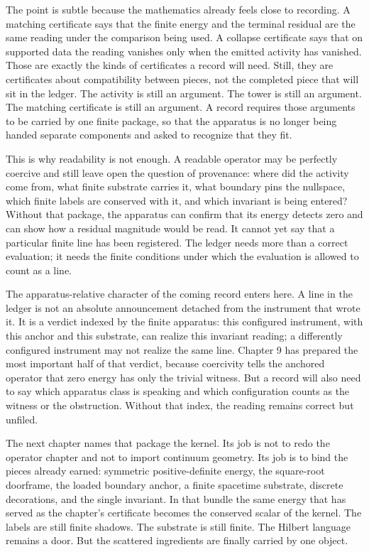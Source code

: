 The point is subtle because the mathematics already feels close to recording. A
matching certificate says that the finite energy and the terminal residual are
the same reading under the comparison being used. A collapse certificate says that on
supported data the reading vanishes only when the emitted activity has vanished.
Those are exactly the kinds of certificates a record will need. Still, they are
certificates about compatibility between pieces, not the completed piece that
will sit in the ledger. The activity is still an argument. The tower is still an
argument. The matching certificate is still an argument. A record requires those
arguments to be carried by one finite package, so that the apparatus is no longer
being handed separate components and asked to recognize that they fit.

This is why readability is not enough. A readable operator may be perfectly
coercive and still leave open the question of provenance: where did the activity
come from, what finite substrate carries it, what boundary pins the nullspace,
which finite labels are conserved with it, and which invariant is being entered?
Without that package, the apparatus can confirm that its energy detects zero and
can show how a residual magnitude would be read. It cannot yet say that a
particular finite line has been registered. The ledger needs more than a correct
evaluation; it needs the finite conditions under which the evaluation is allowed
to count as a line.

The apparatus-relative character of the coming record enters here. A line in the
ledger is not an absolute announcement detached from the instrument that wrote it.
It is a verdict indexed by the finite apparatus: this configured instrument, with
this anchor and this substrate, can realize this invariant reading; a differently
configured instrument may not realize the same line. Chapter 9 has prepared the
most important half of that verdict, because coercivity tells the anchored
operator that zero energy has only the trivial witness. But a record will also
need to say which apparatus class is speaking and which configuration counts as
the witness or the obstruction. Without that index, the reading remains correct
but unfiled.

The next chapter names that package the kernel. Its job is not to redo the
operator chapter and not to import continuum geometry. Its job is to bind the
pieces already earned: symmetric positive-definite energy, the square-root
doorframe, the loaded boundary anchor, a finite spacetime substrate, discrete
decorations, and the single invariant. In that bundle the same energy that has
served as the chapter's certificate becomes the conserved scalar of the kernel.
The labels are still finite shadows. The substrate is still finite. The Hilbert
language remains a door. But the scattered ingredients are finally carried by one
object.

